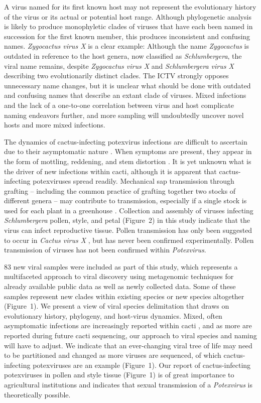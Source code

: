 \documentclass[fleqn,10pt,lineno]{wlpeerj}
\begin{document}
A virus named for its first known host may not represent the evolutionary history of the virus or its actual or potential host range.
Although phylogenetic analysis is likely to produce monophyletic clades of viruses that have each been named in succession for the first known member, this produces inconsistent and confusing names.
\textit{Zygocactus virus X} is a clear example: Although the name \textit{Zygocactus} is outdated in reference to the host genera, now classified as \textit{Schlumbergera}, the viral name remains, despite \textit{Zygocactus virus X} and \textit{Schlumbergera virus X} describing two evolutionarily distinct clades.
The ICTV strongly opposes unnecessary name changes, but it is unclear what should be done with outdated and confusing names that describe an extant clade of viruses.
Mixed infections and the lack of a one-to-one correlation between virus and host complicate naming endeavors further, and more sampling will undoubtedly uncover novel hosts and more mixed infections.


The dynamics of cactus-infecting potexvirus infections are difficult to ascertain due to their asymptomatic nature \citep{maliarenko_cactus_2013, evallo_brief_2021}.
When symptoms are present, they appear in the form of mottling, reddening, and stem distortion \citep{evallo_brief_2021}.
It is yet unknown what is the driver of new infections within cacti, although it is apparent that cactus-infecting potexviruses spread readily. 
Mechanical sap transmission through grafting  -- including the common practice of grafting together two stocks of different genera -- may contribute to transmission, especially if a single stock is used for each plant in a greenhouse \citep{evallo_brief_2021}.
Collection and assembly of viruses infecting \textit{Schlumbergera} pollen, style, and petal (Figure~2) in this study indicate that the virus can infect reproductive tissue.
Pollen transmission has only been suggested to occur in \textit{Cactus virus X} \citep{milbrath_isolation_1972}, but has never been confirmed experimentally.
Pollen transmission of viruses has not been confirmed within \textit{Potexvirus}. 



83 new viral samples were included as part of this study, which represents a multifaceted approach to viral discovery using metagenomic techniques for already available public data as well as newly collected data.
Some of these samples represent new clades within existing species or new species altogether (Figure~1).
We present a view of viral species delimitation that draws on evolutionary history, phylogeny, and host-virus dynamics. 
Mixed, often asymptomatic infections are increasingly reported within cacti \citep{park_detection_2018}, and as more are reported during future cacti sequencing, our approach to viral species and naming will have to adjust.
We indicate that an ever-changing viral tree of life may need to be partitioned and changed as more viruses are sequenced, of which cactus-infecting potexviruses are an example (Figure~1).
Our report of cactus-infecting potexviruses in pollen and style tissue (Figure~1) is of great importance to agricultural institutions and indicates that sexual transmission of a \textit{Potexvirus} is theoretically possible.
\end{document}
